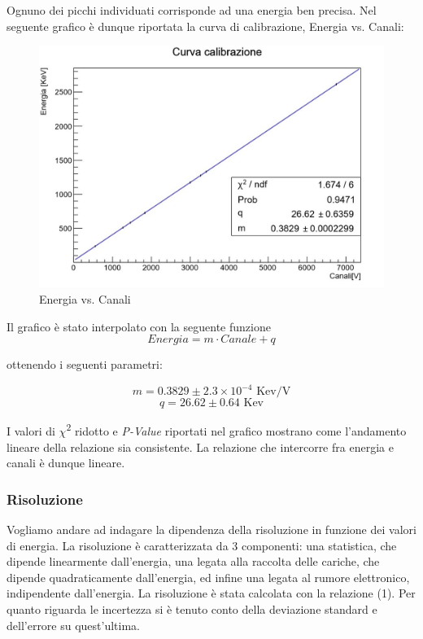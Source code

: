 \documentclass[a4paper,10pt]{article}
\newcommand*{\unit}[1]{\ensuremath{\mathrm{\,#1}}}
\begin{document}
Ognuno dei picchi individuati corrisponde ad una energia ben precisa. Nel seguente grafico è dunque riportata la curva di calibrazione, Energia vs. Canali:

\begin{figure}[H]
    \centering
    \includegraphics[scale=0.45]{grafici/rettacalibrazionesources}
    \caption{Energia vs. Canali}
\end{figure}

Il grafico è stato interpolato con la seguente funzione 
\begin{equation}
	Energia=m\cdot Canale + q
\end{equation}

ottenendo i seguenti parametri:

$$
	m=0.3829 \pm 2.3 \times 10^{-4}\, \unit{Kev/V}
$$
$$
	q=26.62 \pm 0.64\, \unit{Kev}
$$

I valori di $\chi$\textsuperscript{2} ridotto e \textit{P-Value} riportati nel grafico mostrano come l'andamento lineare della relazione sia consistente. La relazione che intercorre fra energia e canali è dunque lineare.

\subsubsection{Risoluzione}
Vogliamo andare ad indagare la dipendenza della risoluzione in funzione dei valori di energia. La risoluzione è caratterizzata da 3 componenti: una statistica, che dipende linearmente dall'energia, una legata alla raccolta delle cariche, che dipende quadraticamente dall'energia, ed infine una legata al rumore elettronico, indipendente dall'energia. La risoluzione è stata calcolata con la relazione (1). Per quanto riguarda le incertezza si è tenuto conto della deviazione standard e dell'errore su quest'ultima. 
\end{document}

